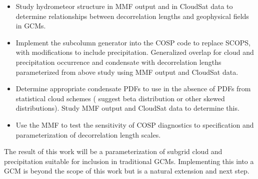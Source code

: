 \documentclass{article}
\begin{document}
\begin{itemize}
\item Study hydrometeor structure in MMF output and in CloudSat data to determine relationships between decorrelation lengths and geophysical fields in GCMs.
\item Implement the \cite{raisanen_et_al_2004} subcolumn generator into the COSP code to replace SCOPS, with modifications to include precipitation. Generalized overlap for cloud and precipitation occurrence and condensate with decorrelation lengths parameterized from above study using MMF output and CloudSat data.
\item Determine appropriate condensate PDFs to use in the absence of PDFs from statistical cloud schemes (\cite{oreopoulos_et_al_2012} suggest beta distribution or other skewed distributions). Study MMF output and CloudSat data to determine this.
\item Use the MMF to test the sensitivity of COSP diagnostics to specification and parameterization of decorrelation length scales.
\end{itemize}

The result of this work will be a parameterization of subgrid cloud and precipitation suitable for inclusion in traditional GCMs. Implementing this into a GCM is beyond the scope of this work but is a natural extension and next step.

%
%
%
%
%   



\end{document}
